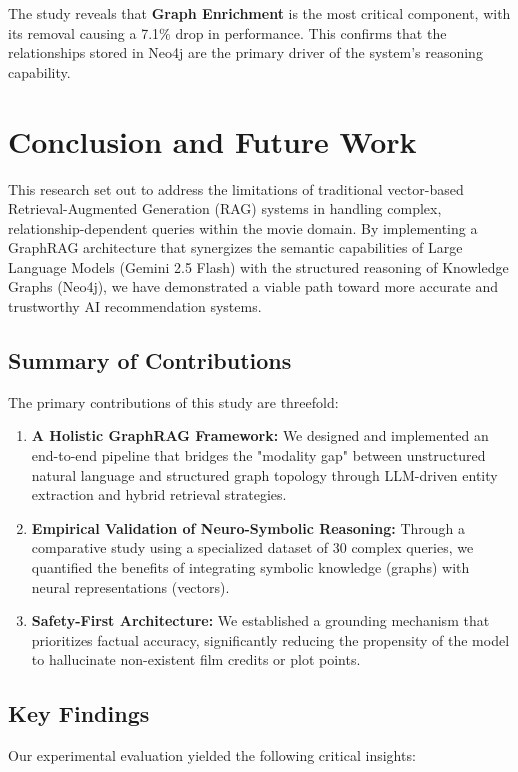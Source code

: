 \documentclass[a4paper, 12pt]{extreport}
\begin{document}
The study reveals that \textbf{Graph Enrichment} is the most critical component, with its removal causing a 7.1\% drop in performance. This confirms that the relationships stored in Neo4j are the primary driver of the system's reasoning capability.

\chapter{Conclusion and Future Work}
\label{ch:conclusion}

This research set out to address the limitations of traditional vector-based Retrieval-Augmented Generation (RAG) systems in handling complex, relationship-dependent queries within the movie domain. By implementing a GraphRAG architecture that synergizes the semantic capabilities of Large Language Models (Gemini 2.5 Flash) with the structured reasoning of Knowledge Graphs (Neo4j), we have demonstrated a viable path toward more accurate and trustworthy AI recommendation systems.

\section{Summary of Contributions}
The primary contributions of this study are threefold:
\begin{enumerate}
    \item \textbf{A Holistic GraphRAG Framework:} We designed and implemented an end-to-end pipeline that bridges the "modality gap" between unstructured natural language and structured graph topology through LLM-driven entity extraction and hybrid retrieval strategies.
    \item \textbf{Empirical Validation of Neuro-Symbolic Reasoning:} Through a comparative study using a specialized dataset of 30 complex queries, we quantified the benefits of integrating symbolic knowledge (graphs) with neural representations (vectors).
    \item \textbf{Safety-First Architecture:} We established a grounding mechanism that prioritizes factual accuracy, significantly reducing the propensity of the model to hallucinate non-existent film credits or plot points.
\end{enumerate}

\section{Key Findings}
Our experimental evaluation yielded the following critical insights:
\end{document}
